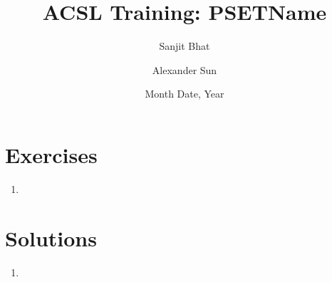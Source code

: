 \documentclass[11pt,letterpaper]{article}
\title{ACSL Training: PSETName}
\author{Sanjit Bhat \and Alexander Sun}
\date{Month Date, Year}
\begin{document}
    \maketitle
    \section{Exercises}
    \begin{enumerate}
        \item
    \end{enumerate}

    \newpage
    \section{Solutions}
    \begin{enumerate}
        \item
    \end{enumerate}
\end{document}
